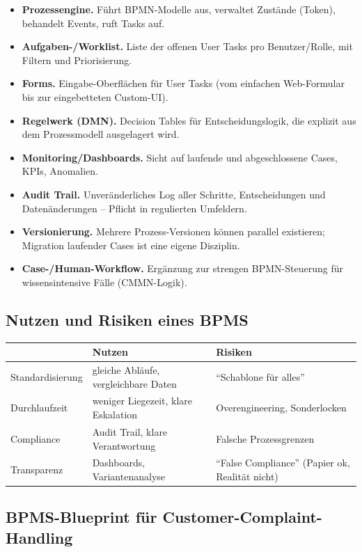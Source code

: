 \documentclass[11pt,a4paper,oneside]{article}
\newcommand{\fachbegriff}[1]{\textbf{#1}}
\begin{document}
\begin{itemize}
  \item \fachbegriff{Prozessengine.} Führt BPMN-Modelle aus, verwaltet Zustände (Token), behandelt Events, ruft Tasks auf.
  \item \fachbegriff{Aufgaben-/Worklist.} Liste der offenen User Tasks pro Benutzer/Rolle, mit Filtern und Priorisierung.
  \item \fachbegriff{Forms.} Eingabe-Oberflächen für User Tasks (vom einfachen Web-Formular bis zur eingebetteten Custom-UI).
  \item \fachbegriff{Regelwerk (DMN).} Decision Tables für Entscheidungslogik, die explizit aus dem Prozessmodell ausgelagert wird.
  \item \fachbegriff{Monitoring/Dashboards.} Sicht auf laufende und abgeschlossene Cases, KPIs, Anomalien.
  \item \fachbegriff{Audit Trail.} Unveränderliches Log aller Schritte, Entscheidungen und Datenänderungen -- Pflicht in regulierten Umfeldern.
  \item \fachbegriff{Versionierung.} Mehrere Prozess-Versionen können parallel existieren; Migration laufender Cases ist eine eigene Disziplin.
  \item \fachbegriff{Case-/Human-Workflow.} Ergänzung zur strengen BPMN-Steuerung für wissensintensive Fälle (CMMN-Logik).
\end{itemize}

\subsection{Nutzen und Risiken eines BPMS}

\begin{tabularx}{\linewidth}{@{}lXX@{}}
\toprule
& \textbf{Nutzen} & \textbf{Risiken} \\
\midrule
Standardisierung & gleiche Abläufe, vergleichbare Daten & ``Schablone für alles'' \\
Durchlaufzeit & weniger Liegezeit, klare Eskalation & Overengineering, Sonderlocken \\
Compliance & Audit Trail, klare Verantwortung & Falsche Prozessgrenzen \\
Transparenz & Dashboards, Variantenanalyse & ``False Compliance'' (Papier ok, Realität nicht) \\
\bottomrule
\end{tabularx}

\medskip

\subsection{BPMS-Blueprint für Customer-Complaint-Handling}
\end{document}
